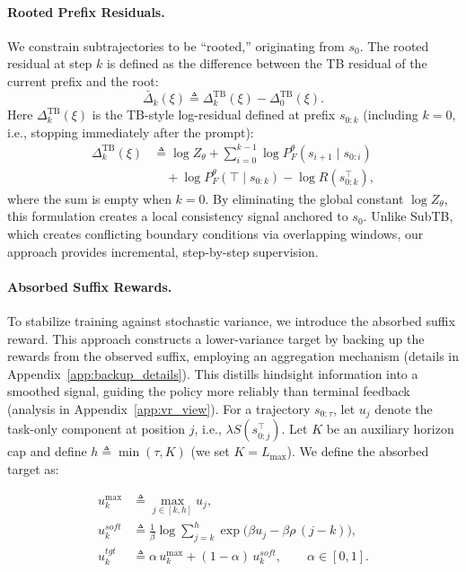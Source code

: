 \documentclass{article}
\theoremstyle{plain}
\theoremstyle{definition}
\theoremstyle{remark}
\begin{document}
\paragraph{Rooted Prefix Residuals.}
We constrain subtrajectories to be ``rooted,'' originating from $s_0$. The rooted residual at step $k$ is defined as the difference between the TB residual of the current prefix and the root:
\begin{equation}
\label{eq:rooted}
\bar\Delta_k(\xi)
\triangleq
\Delta_k^{\mathrm{TB}}(\xi)
-
\Delta_0^{\mathrm{TB}}(\xi).
\end{equation}
Here $\Delta_k^{\mathrm{TB}}(\xi)$ is the TB-style log-residual defined at prefix $s_{0:k}$ (including $k=0$, i.e., stopping immediately after the prompt):
\[
\begin{aligned}
\Delta_k^{\mathrm{TB}}(\xi)
&\triangleq
\log Z_\theta
+
\sum_{i=0}^{k-1}\log P_F^\theta(s_{i+1}\mid s_{0:i})
\\
&\quad+
\log P_F^\theta(\top\mid s_{0:k})
-
\log R(s_{0:k}^{\top}),
\end{aligned}
\]
where the sum is empty when $k=0$.
By eliminating the global constant $\log Z_\theta$, this formulation creates a local consistency signal anchored to $s_0$. Unlike SubTB, which creates conflicting boundary conditions via overlapping windows, our approach provides incremental, step-by-step supervision.

\paragraph{Absorbed Suffix Rewards.}
To stabilize training against stochastic variance, we introduce the absorbed suffix reward. This approach constructs a lower-variance target by backing up the rewards from the observed suffix, employing an aggregation mechanism (details in Appendix~\ref{app:backup_details}). This distills hindsight information into a smoothed signal, guiding the policy more reliably than terminal feedback (analysis in Appendix~\ref{app:vr_view}). For a trajectory $s_{0:\tau}$, let $u_j$ denote the task-only component at position $j$, i.e., $\lambda S(s_{0:j}^{\top})$. Let $K$ be an auxiliary horizon cap and define $h\triangleq\min(\tau,K)$ (we set $K=L_{\max}$). We define the absorbed target as:

\begin{align}
\label{eq:backup_defs}
u_k^{\max}
&\triangleq \max_{j\in[k,h]} u_j,\\
u_k^{soft}
&\triangleq
\frac{1}{\beta}\log \sum_{j=k}^{h}\exp\!\Big(\beta u_j - \beta\rho\,(j-k)\Big),\\
u_k^{tgt}
&\triangleq
\alpha\,u_k^{\max} + (1-\alpha)\,u_k^{soft},\qquad \alpha\in[0,1].
\end{align}
\end{document}
